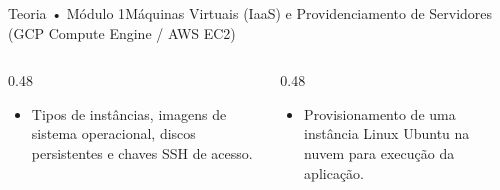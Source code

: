 \begin{senaiframe}{Teoria • Módulo 1}{Máquinas Virtuais (IaaS) e Providenciamento de Servidores (GCP Compute Engine / AWS EC2)}
  \begin{columns}[t]
    \begin{column}{0.48\textwidth}
      \begin{tcolorbox}[senaibluecard, title={Fundamentos Teóricos}]
        \begin{itemize}
          \item Tipos de instâncias, imagens de sistema operacional, discos persistentes e chaves SSH de acesso.
        \end{itemize}
      \end{tcolorbox}
    \end{column}
    \begin{column}{0.48\textwidth}
      \begin{tcolorbox}[senaigreencard, title={Prática \& Laboratório}]
        \begin{itemize}
          \item Provisionamento de uma instância Linux Ubuntu na nuvem para execução da aplicação.
        \end{itemize}
      \end{tcolorbox}
    \end{column}
  \end{columns}
\end{senaiframe}
